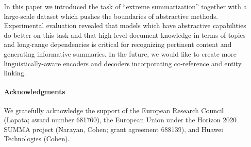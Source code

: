 \documentclass[11pt,a4paper]{article}
\begin{document}
In this paper we introduced the task of ``extreme summarization''
together with a large-scale dataset which pushes the boundaries of
abstractive methods.  Experimental evaluation revealed that models
which have abstractive capabilities do better on this task and that
high-level document knowledge in terms of topics and long-range
dependencies is critical for recognizing pertinent content and
generating informative summaries. In the future, we would like to
create more linguistically-aware encoders and decoders incorporating
co-reference and entity linking.

\vspace{-0.1cm}


\paragraph{Acknowledgments} We gratefully acknowledge the support of
the European Research Council (Lapata; award number 681760), the
European Union under the Horizon 2020 SUMMA project (Narayan, Cohen;
grant agreement 688139), and Huawei Technologies (Cohen).






\end{document}
